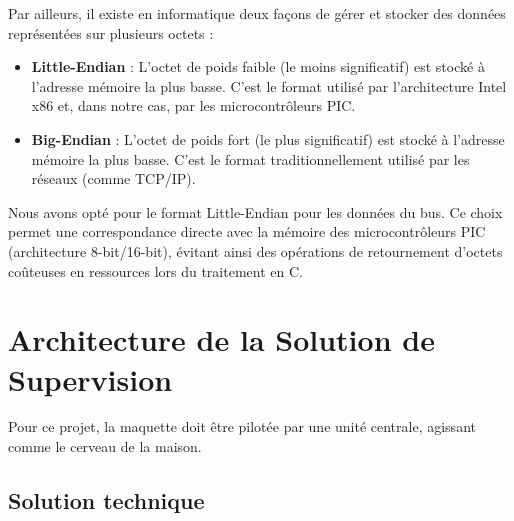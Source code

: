         Par ailleurs, il existe en informatique deux façons de gérer et stocker des données représentées sur plusieurs octets :
    \begin{itemize}
        \item \textbf{Little-Endian} : L'octet de poids faible (le moins significatif) est stocké à l'adresse mémoire la plus basse. C'est le format utilisé par l'architecture Intel x86 et, dans notre cas, par les microcontrôleurs PIC.
        \item \textbf{Big-Endian} : L'octet de poids fort (le plus significatif) est stocké à l'adresse mémoire la plus basse. C'est le format traditionnellement utilisé par les réseaux (comme TCP/IP).
    \end{itemize}

    Nous avons opté pour le format Little-Endian pour les données du bus. Ce choix permet une correspondance directe avec la mémoire des microcontrôleurs PIC (architecture 8-bit/16-bit), évitant ainsi des opérations de retournement d'octets coûteuses en ressources lors du traitement en C.
    
\section{Architecture de la Solution de Supervision}
    Pour ce projet, la maquette doit être pilotée par une unité centrale, agissant comme le cerveau de la maison.

    \subsection{Solution technique}


